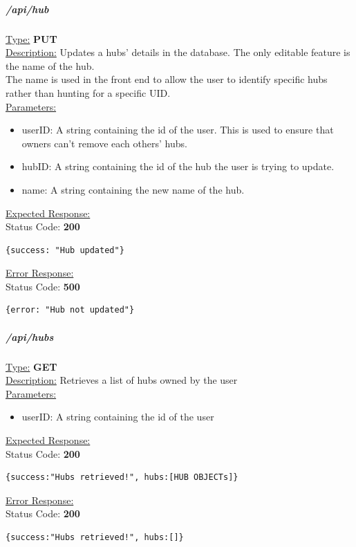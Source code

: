 \documentclass[preprint,12pt,3p]{elsarticle}
\newcommand{\forceindent}{\leavevmode{\parindent=1em\indent}}
\begin{document}
\subparagraph*{/api/hub}
\underline{Type:} \textbf{PUT}\\

\underline{Description:} Updates a hubs' details in the database. The only editable feature is the name of the hub.\\
The name is used in the front end to allow the user to identify specific hubs rather than hunting for a specific UID.\\

\underline{Parameters:}
\begin{itemize}
\item userID: A string containing the id of the user. This is used to ensure that owners can't remove each others' hubs.

\item hubID: A string containing the id of the hub the user is trying to update.

\item name: A string containing the new name of the hub.
\end{itemize}

\underline{Expected Response:}\\[5pt]
\forceindent Status Code: \textbf{200} \\
\begin{verbatim}
{success: "Hub updated"}
\end{verbatim}

\underline{Error Response:}\\[5pt]
\forceindent Status Code: \textbf{500} \\
\begin{verbatim}
{error: "Hub not updated"}
\end{verbatim}

\subparagraph*{/api/hubs}
\underline{Type:} \textbf{GET}\\

\underline{Description:} Retrieves a list of hubs owned by the user\\

\underline{Parameters:}
\begin{itemize}
\item userID: A string containing the id of the user
\end{itemize}
\underline{Expected Response:}\\[5pt]
\forceindent Status Code: \textbf{200} \\
\begin{verbatim}
{success:"Hubs retrieved!", hubs:[HUB OBJECTs]}
\end{verbatim}
\underline{Error Response:}\\[5pt]
\forceindent Status Code: \textbf{200} \\
\begin{verbatim}
{success:"Hubs retrieved!", hubs:[]}
\end{verbatim}
\end{document}
